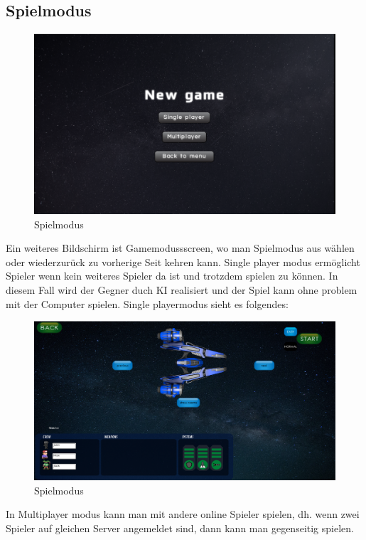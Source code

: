 \documentclass[fontsize=12pt,paper=a4,twoside]{scrartcl}
\begin{document}
\subsection{Spielmodus}
\begin{figure}[htp]
	\centering
	\includegraphics[width=1.00\linewidth]{pics/gamemodescreen.png}
	\caption{Spielmodus}
	\label{fig1}
\end{figure}
\newpage
Ein weiteres Bildschirm ist Gamemodussscreen, wo man Spielmodus aus wählen oder wiederzurück zu vorherige Seit kehren kann. Single player modus ermöglicht Spieler wenn kein weiteres Spieler da ist und trotzdem spielen zu können. In diesem Fall wird der Gegner duch KI realisiert und der Spiel kann ohne problem mit der Computer spielen. Single playermodus sieht es folgendes:
\begin{figure}[htp]
	\centering
	\includegraphics[width=1.00\linewidth]{pics/singleplayerscreen.png}
	\caption{Spielmodus}
	\label{fig1}
\end{figure}
\newpage
 In Multiplayer modus kann man mit andere online Spieler spielen, dh. wenn zwei Spieler auf gleichen Server angemeldet sind, dann kann man gegenseitig spielen.  
\newpage
\end{document}
